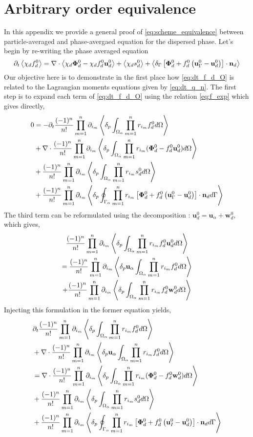 \documentclass[11pt]{My_preprint}
\begin{document}
\section{Arbitrary order equivalence}
\label{sec:demo}
In this appendix we provide a general proof of \ref{eq:scheme_equivalence} between particle-averaged and phase-avergaed equation for the dispersed phase. 
Let's begin by re-writing the phase averaged equation
\begin{equation}
        \pddt \avg{\chi_d f_d^0}
        = \div \avg{\chi_d \bm\Phi_d^0 - \chi_d f_d^0 \textbf{u}_d^0}
        + \avg{\chi_d s_d^0}
        + \avg{\delta_\Gamma\left[
            \bm\Phi_d^0
            + f_d^0
            \left(
                \textbf{u}_\Gamma^0
                - \textbf{u}_d^0
            \right)
        \right]
        \cdot \textbf{n}_d} 
        \label{eq:dt_f_d_O}
\end{equation}
Our objective here is to demonstrate in the first place how \ref{eq:dt_f_d_O} is related to the Lagrangian moments equations given by \ref{eq:dt_q_n}. 
The first step is to expand each term of \ref{eq:dt_f_d_O} using the relation \ref{eq:f_exp} which gives directly,
\begin{align*}
        0 &=
        - \partial_t \frac{(-1)^{n}}{{n}!} \prod_{m=1}^{n} \partial_{i_m} \left<\delta_p \int_{\Omega_{\alpha}}  \prod_{m=1}^{n} r_{i_m}f_d^0  d\Omega\right> \\
        &+\mathbf{\nabla}\cdot \frac{(-1)^{n}}{{n}!} \prod_{m=1}^{n} \partial_{i_m} \left<\delta_p \int_{\Omega_{\alpha}}  \prod_{m=1}^{n} r_{i_m}(\bm\Phi_d^0  - f_d^0 \textbf{u}_d^0)  d\Omega\right>\\
        &+ \frac{(-1)^{n}}{{n}!} \prod_{m=1}^{n} \partial_{i_m} \left<\delta_p \int_{\Omega_{\alpha}}  \prod_{m=1}^{n} r_{i_m} s_d^0  d\Omega\right>\\
        &+ \frac{(-1)^n}{n!} \prod_{m=1}^{n} \partial_{i_m} \left<\delta_p \oint_{\Gamma_{\alpha}} \prod_{m=1}^{n} r_{i_m}\left[
            \bm\Phi_d^0
            + f_d^0
            \left(
                \textbf{u}_\Gamma^0
                - \textbf{u}_d^0
            \right)
        \right]
        \cdot \textbf{n}_d  d\Gamma\right> \\
\end{align*}
The third term can be reformulated using the decomposition : $\textbf{u}_d^0 = \textbf{u}_\alpha + \textbf{w}_d^0$, which gives,
\begin{multline}
    \frac{(-1)^{n}}{{n}!} \prod_{m=1}^{n} \partial_{i_m} \left<\delta_p \int_{\Omega_{\alpha}}  \prod_{m=1}^{n} r_{i_m}f_d^0 \textbf{u}_d^0  d\Omega\right>\\
    =     \frac{(-1)^n}{n!} \prod_{m=1}^{n} \partial_{i_m} \left<\delta_p \textbf{u}_\alpha\int_{\Omega_{\alpha}}  \prod_{m=1}^{n} r_{i_m}f_d^0   d\Omega\right>\\
    +     \frac{(-1)^{n}}{{n}!} \prod_{m=1}^{n} \partial_{i_m} \left<\delta_p \int_{\Omega_{\alpha}}  \prod_{m=1}^{n} r_{i_m}f_d^0 \textbf{w}_d^0  d\Omega\right>
\end{multline}
Injecting this formulation in the former equation yields,
\begin{align}
    & \pddt \expo{f_d^0} \\
    &+ \div \expoU{f_d^0}\\
    &= \div \expo{(\bm\Phi_d^0 - f_d^0 \textbf{w}_d^0)}\\
    &+ \expo{ s_d^0}\\
    &+ \expoS{\left[
        \bm\Phi_d^0
        + f_d^0 
        \left(
            \textbf{u}_I^0
            - \textbf{u}_d^0
        \right)
    \right]
    \cdot \textbf{n}_d} \\
    \label{eq:nearly_done}
\end{align}
\end{document}
